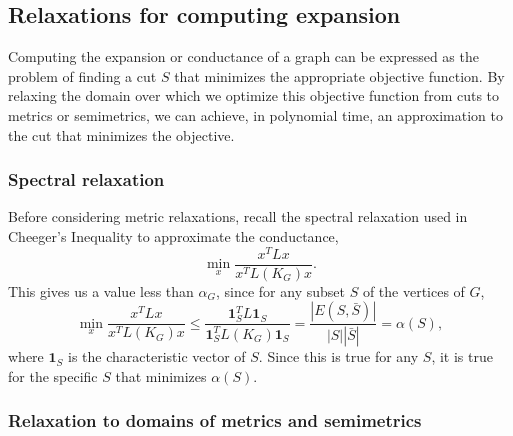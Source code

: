 \documentclass[11pt]{article}
\newcommand{\0}{\mathbf{0}}
\newcommand{\1}{\mathbf{1}}
\begin{document}
\subsection{Relaxations for computing expansion}

Computing the expansion or conductance of a graph can be expressed as the problem of finding a cut $S$ that minimizes the appropriate objective function.
By relaxing the domain over which we optimize this objective function from cuts to metrics or semimetrics, we can achieve, in polynomial time, an approximation to the cut that minimizes the objective.

\subsubsection{Spectral relaxation}

Before considering metric relaxations, recall the spectral relaxation used in Cheeger's Inequality to approximate the conductance,
\begin{equation*}
  \min_x \frac{x^T L x}{x^T L(K_G) x}.
\end{equation*}
This gives us a value less than $\alpha_G$, since for any subset $S$ of the vertices of $G$,
\begin{equation*}
  \min_x \frac{x^T L x}{x^T L(K_G) x} \leq \frac{\1_S^T L \1_S}{\1_S^T L(K_G) \1_S} = \frac{|E(S, \bar{S})|}{|S| |\bar{S}|} = \alpha(S),
\end{equation*}
where $\1_S$ is the characteristic vector of $S$.
Since this is true for any $S$, it is true for the specific $S$ that minimizes $\alpha(S)$.

\subsubsection{Relaxation to domains of metrics and semimetrics}
\end{document}
